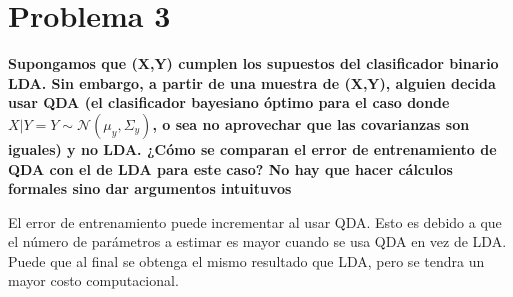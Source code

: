\section*{Problema 3}

\textbf{Supongamos que (X,Y) cumplen los supuestos del clasificador binario LDA. Sin embargo, a partir de una muestra de (X,Y), alguien decida usar QDA (el clasificador bayesiano óptimo para el caso donde $X|Y = Y \sim \mathcal{N}(\mu_y,\Sigma_y)$, o sea no aprovechar que las covarianzas son iguales) y no LDA. ¿Cómo se comparan el error de entrenamiento de QDA con el de LDA para este caso? No hay que hacer cálculos formales sino dar argumentos intuituvos}

El error de entrenamiento puede incrementar al usar QDA. Esto es debido a que el número de parámetros a estimar es mayor cuando se usa QDA en vez de LDA. Puede que al final se obtenga el mismo resultado que LDA, pero se tendra un mayor costo computacional.